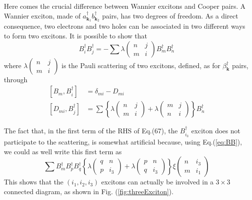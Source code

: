 \documentclass[epj]{svjour}
\newcommand{\vk}{\ensuremath{\mathbf{k}}}
\begin{document}
Here comes the crucial difference between Wannier excitons and Cooper pairs. A Wannier exciton, made of $a^\dagger_{\vk_1}b^\dagger_{\vk_2}$ pairs, has two degrees of freedom. As a direct consequence,  two electrons and two holes can be associated in two different ways to form two excitons. It is possible to show \cite{CobosonPhysicsReports} that
\begin{equation}\label{eq:BB}
B^\dagger_iB^\dagger_j=-\sum\lambda\left(\begin{smallmatrix}n&j\\m&i\end{smallmatrix}%
\right)  B^{\dagger}_{m}B^{\dagger}_{n}
\end{equation}
where $\lambda\left(\begin{smallmatrix}n&j\\m&i\end{smallmatrix}\right)$  is the Pauli scattering of two excitons, defined, as for $\beta^\dagger_\vk$ pairs, through
\begin{equation}
\begin{split}
\left[B_m,B^{\dagger}_{i}\right]&=\delta_{mi}-D_{mi}\\
\left[D_{mi},B^{\dagger}_{j}\right]&=\sum\left\{\lambda\left(\begin{smallmatrix}n&j\\m&i\end{smallmatrix}\right)
+\lambda\left(\begin{smallmatrix}m&j\\n&i\end{smallmatrix}\right)\right\} B^{\dagger}_{n}
\end{split}
\end{equation}

The fact that, in the first term of the RHS of Eq.(67), the $B^\dagger_{i_3}$ exciton does not participate to the scattering, is  somewhat artificial because, using Eq.(\ref{eq:BB}), we could as well write this first term as
\begin{equation}\label{eq:3BLambdaXi}
\sum{}B^\dagger_mB^\dagger_pB^\dagger_q\left\{\lambda\left(\begin{smallmatrix}q&n\\p&i_3\end{smallmatrix}\right)
+\lambda\left(\begin{smallmatrix}p&n\\q&i_3\end{smallmatrix}\right)\right\} \xi\left(\begin{smallmatrix}n&i_3\\m&i_1\end{smallmatrix}\right)
\end{equation}
This shows that the $(i_1,i_2,i_3)$ excitons can actually be involved in a $3\times3$ connected diagram, as shown in Fig. (\ref{fig:threeExciton}).
\end{document}
